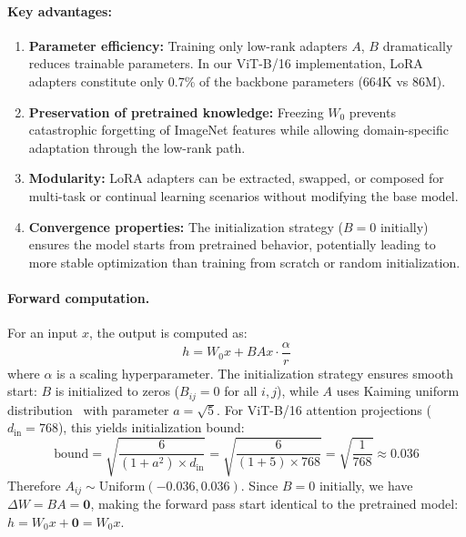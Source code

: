 \documentclass[11pt]{article}
\begin{document}
\paragraph{Key advantages:}
\begin{enumerate}
    \item \textbf{Parameter efficiency:} Training only low-rank adapters $A$, $B$ dramatically reduces trainable parameters. In our ViT-B/16 implementation, LoRA adapters constitute only 0.7\% of the backbone parameters (664K vs 86M).

    \item \textbf{Preservation of pretrained knowledge:} Freezing $W_0$ prevents catastrophic forgetting of ImageNet features while allowing domain-specific adaptation through the low-rank path.

    \item \textbf{Modularity:} LoRA adapters can be extracted, swapped, or composed for multi-task or continual learning scenarios without modifying the base model.

    \item \textbf{Convergence properties:} The initialization strategy ($B=0$ initially) ensures the model starts from pretrained behavior, potentially leading to more stable optimization than training from scratch or random initialization.
\end{enumerate}

\paragraph{Forward computation.}
For an input $x$, the output is computed as:
\begin{equation}
    h = W_0 x + BAx \cdot \frac{\alpha}{r}
\end{equation}
where $\alpha$ is a scaling hyperparameter. The initialization strategy ensures smooth start: $B$ is initialized to zeros ($B_{ij} = 0$ for all $i,j$), while $A$ uses Kaiming uniform distribution~\cite{he2015delving} with parameter $a = \sqrt{5}$. For ViT-B/16 attention projections ($d_{\text{in}}=768$), this yields initialization bound:
\begin{equation}
    \text{bound} = \sqrt{\frac{6}{(1+a^2) \times d_{\text{in}}}} = \sqrt{\frac{6}{(1+5) \times 768}} = \sqrt{\frac{1}{768}} \approx 0.036
\end{equation}
Therefore $A_{ij} \sim \text{Uniform}(-0.036, 0.036)$. Since $B=0$ initially, we have $\Delta W = BA = \mathbf{0}$, making the forward pass start identical to the pretrained model: $h = W_0 x + \mathbf{0} = W_0 x$.
\end{document}
